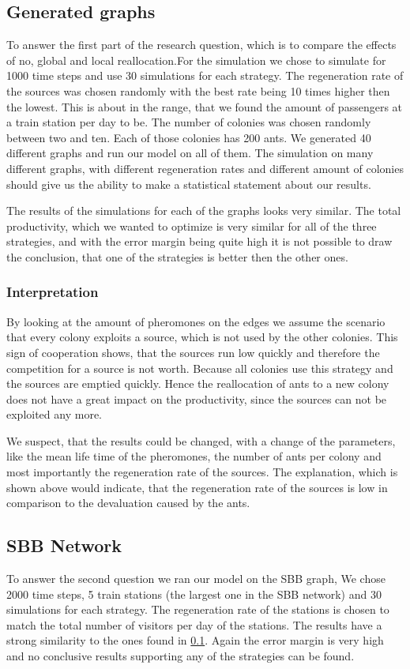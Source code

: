 \subsection{Generated graphs} \label{results1}
To answer the first part of the research question, which is to compare the effects of no, global and local reallocation.For the simulation we chose to simulate for 1000 time steps and use 30 simulations for each strategy. The regeneration rate of the sources was chosen randomly with the best rate being 10 times higher then the lowest. This is about in the range, that we found the amount of passengers at a train station per day to be. The number of colonies was chosen randomly between two and ten. Each of those colonies has 200 ants. We generated 40 different graphs and run our model on all of them. The simulation on many different graphs, with different regeneration rates and different amount of colonies should give us the ability to make a statistical statement about our results.

The results of the simulations for each of the graphs looks very similar. The total productivity, which we wanted to optimize is very similar for all of the three strategies, and with the error margin being quite high it is not possible to draw the conclusion, that one of the strategies is better then the other ones. 
\subsubsection{Interpretation}
By looking at the amount of pheromones on the edges we assume the scenario that every colony exploits a source, which is not used by the other colonies. This sign of cooperation shows, that the sources run low quickly and therefore the competition for a source is not worth. Because all colonies use this strategy and the sources are emptied quickly. Hence the reallocation of ants to a new colony does not have a great impact on the productivity, since the sources can not be exploited any more. 

We suspect, that the results could be changed, with a change of the parameters, like the mean life time of the pheromones, the number of ants per colony and most importantly the regeneration rate of the sources. The explanation, which is shown above would indicate, that the regeneration rate of the sources is low in comparison to the devaluation caused by the ants.

\subsection{SBB Network}
To answer the second question we ran our model on the SBB graph, We chose 2000 time steps, 5 train stations (the largest one in the SBB network) and 30 simulations for each strategy. The regeneration rate of the stations is chosen to match the total number of visitors per day of the stations. The results have a strong similarity to the ones found in \ref{results1}. Again the error margin is very high and no conclusive results supporting any of the strategies can be found. 